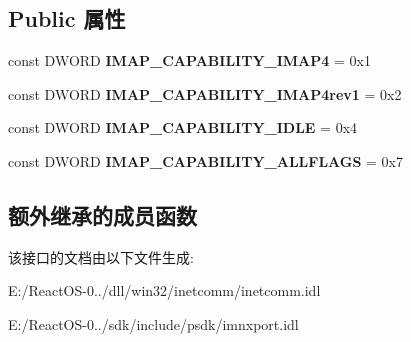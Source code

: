 \subsection*{Public 属性}
\begin{DoxyCompactItemize}
\item 
\mbox{\label{class_i_i_m_a_p_transport_ae2427f5fd5c69bc10de90ef7c357ad57}} 
const D\+W\+O\+RD {\bfseries I\+M\+A\+P\+\_\+\+C\+A\+P\+A\+B\+I\+L\+I\+T\+Y\+\_\+\+I\+M\+A\+P4} = 0x1
\item 
\mbox{\label{class_i_i_m_a_p_transport_a713d606f48b6dac9fa2dbd16b1f6d37d}} 
const D\+W\+O\+RD {\bfseries I\+M\+A\+P\+\_\+\+C\+A\+P\+A\+B\+I\+L\+I\+T\+Y\+\_\+\+I\+M\+A\+P4rev1} = 0x2
\item 
\mbox{\label{class_i_i_m_a_p_transport_aad278f0ea07804d142e650e294c05d11}} 
const D\+W\+O\+RD {\bfseries I\+M\+A\+P\+\_\+\+C\+A\+P\+A\+B\+I\+L\+I\+T\+Y\+\_\+\+I\+D\+LE} = 0x4
\item 
\mbox{\label{class_i_i_m_a_p_transport_ab8287a814f61be1ca6b5f29a47c5a611}} 
const D\+W\+O\+RD {\bfseries I\+M\+A\+P\+\_\+\+C\+A\+P\+A\+B\+I\+L\+I\+T\+Y\+\_\+\+A\+L\+L\+F\+L\+A\+GS} = 0x7
\end{DoxyCompactItemize}
\subsection*{额外继承的成员函数}


该接口的文档由以下文件生成\+:\begin{DoxyCompactItemize}
\item 
E\+:/\+React\+O\+S-\/0../dll/win32/inetcomm/inetcomm.\+idl\item 
E\+:/\+React\+O\+S-\/0../sdk/include/psdk/imnxport.\+idl\end{DoxyCompactItemize}

